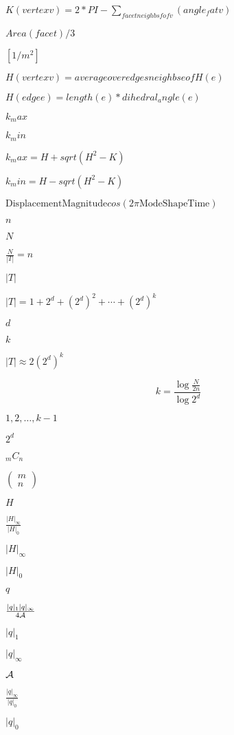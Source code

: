 \documentclass{article}
\begin{document}
$K(vertex v) = 2*PI-\sum_{facet neighbs f of v} (angle_f at v)$
\pagebreak

$Area(facet)/3$
\pagebreak

$[1/m^2]$
\pagebreak

$H(vertex v) = average over edges neighbs e of H(e)$
\pagebreak

$H(edge e) = length(e)*dihedral_angle(e)$
\pagebreak

$k_max$
\pagebreak

$k_min$
\pagebreak

$k_max = H + sqrt(H^2 - K)$
\pagebreak

$k_min = H - sqrt(H^2 - K)$
\pagebreak

$ \mathrm{DisplacementMagnitude} cos( 2\pi \mathrm{ModeShapeTime} ) $
\pagebreak

$n$
\pagebreak

$N$
\pagebreak

$\frac{N}{|T|} = n$
\pagebreak

$|T|$
\pagebreak

$|T| = 1 + 2^d + \left(2^d\right)^2 + \cdots + \left(2^d\right)^k$
\pagebreak

$d$
\pagebreak

$k$
\pagebreak

$|T|\approx 2 \left(2^d\right)^k$
\pagebreak

\[ k = \frac{\log{\frac{N}{2n}}}{\log{2^d}} \]
\pagebreak

$1, 2, \ldots, k-1$
\pagebreak

$2^d$
\pagebreak

$_mC_n$
\pagebreak

$\left(\begin{array}{c}m \\ n\end{array}\right)$
\pagebreak

$H$
\pagebreak

$\frac{|H|_\infty}{|H|_0}$
\pagebreak

$|H|_\infty$
\pagebreak

$|H|_0$
\pagebreak

$q$
\pagebreak

$\frac{|q|_1|q|_\infty}{4{\cal A}}$
\pagebreak

$|q|_1$
\pagebreak

$|q|_\infty$
\pagebreak

${\cal A}$
\pagebreak

$\frac{|q|_\infty}{|q|_0}$
\pagebreak

$|q|_0$
\pagebreak
\end{document}
